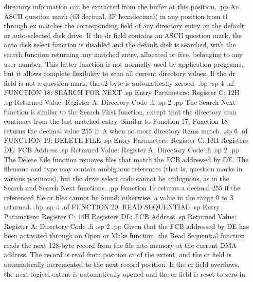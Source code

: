 directory information can be extracted from the buffer at this 
position.
.pp
An ASCII question mark (63 decimal, 3F hexadecimal) in any 
position from f1 through ex matches the corresponding field of 
any directory entry on the default or auto-selected disk drive.  
If the dr field contains an ASCII question mark, the auto disk 
select function is disabled and the default disk is searched, 
with the search function returning any matched entry, allocated 
or free, belonging to any user number.  This latter function is 
not normally used by application programs, but it allows complete 
flexibility to scan all current directory values.  If the dr 
field is not a question mark, the s2 byte is automatically 
zeroed.
.bp
.sp 4
.nf
                  FUNCTION 18:  SEARCH FOR NEXT
.sp
                 Entry Parameters:
                       Register C:  12H
.sp
                   Returned Value:
                      Register  A:  Directory Code
.fi
.sp 2
.pp
The Search Next function is similar to the Search First function, except 
that the directory scan continues from the last matched entry.  
Similar to Function 17, Function 18 returns the decimal value 255 
in A when no more directory items match.
.sp 6
.nf
                    FUNCTION 19:  DELETE FILE
.sp
                Entry Parameters:
                      Register C:  13H
                    Registers DE:  FCB Address
.sp
                Returned Value:
                     Register  A:  Directory Code
.fi
.sp 2
.pp
The Delete File function removes files that match the FCB 
addressed by DE.  The filename and type may contain ambiguous 
references (that is, question marks in various positions), but the 
drive select code cannot be ambiguous, as in the Search and 
Search Next functions.
.pp
Function 19 returns a decimal 255 if the referenced file or files 
cannot be found; otherwise, a value in the range 0 to 3 returned.
.bp
.sp 4
.nf
                  FUNCTION 20:  READ SEQUENTIAL
.sp
               Entry Parameters: 
                     Register C:  14H
                   Registers DE:  FCB Address
.sp
               Returned Value:
                    Register  A:  Directory Code
.fi
.sp 2
.pp
Given that the FCB addressed by DE has been activated through an 
Open or Make function, the Read Sequential function reads the 
next 128-byte record from the file into memory at the current DMA 
address.  The record is read from position cr of the extent, and 
the cr field is automatically incremented to the next record 
position.  If the cr field overflows, the next logical extent is 
automatically opened and the cr field is reset to zero in 
